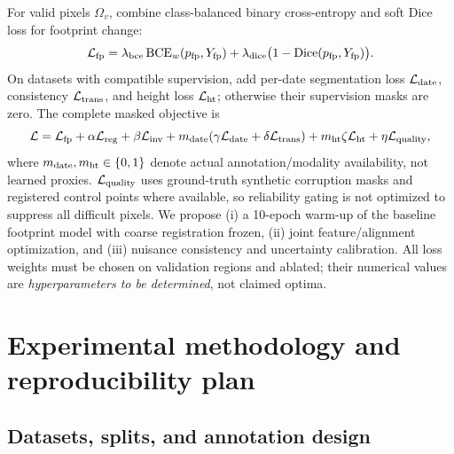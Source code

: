 For valid pixels $\Omega_v$, combine class-balanced binary cross-entropy and soft Dice loss for footprint change:
\begin{equation}
 {\cal L}_{\rm fp}=\lambda_{\rm bce}\,{\rm BCE}_w(p_{\rm fp},Y_{\rm fp})
  +\lambda_{\rm dice}\big(1-\operatorname{Dice}(p_{\rm fp},Y_{\rm fp})\big).
 \label{eq:footloss}
\end{equation}
On datasets with compatible supervision, add per-date segmentation loss $\mathcal L_{\rm date}$, consistency $\mathcal L_{\rm trans}$, and height loss $\mathcal L_{\rm ht}$; otherwise their supervision masks are zero. The complete masked objective is
\begin{equation}
 \mathcal L=\mathcal L_{\rm fp}+\alpha\mathcal L_{\rm reg}
 +\beta\mathcal L_{\rm inv}+m_{\rm date}(\gamma\mathcal L_{\rm date}+\delta\mathcal L_{\rm trans})
 +m_{\rm ht}\zeta\mathcal L_{\rm ht}+\eta\mathcal L_{\rm quality},
 \label{eq:total}
\end{equation}
where $m_{\rm date},m_{\rm ht}\in\{0,1\}$ denote actual annotation/modality availability, not learned proxies. $\mathcal L_{\rm quality}$ uses ground-truth synthetic corruption masks and registered control points where available, so reliability gating is not optimized to suppress all difficult pixels. We propose (i) a 10-epoch warm-up of the baseline footprint model with coarse registration frozen, (ii) joint feature/alignment optimization, and (iii) nuisance consistency and uncertainty calibration. All loss weights must be chosen on validation regions and ablated; their numerical values are \emph{hyperparameters to be determined}, not claimed optima.

\section{Experimental methodology and reproducibility plan}
\label{sec:experiment}

\subsection{Datasets, splits, and annotation design}

